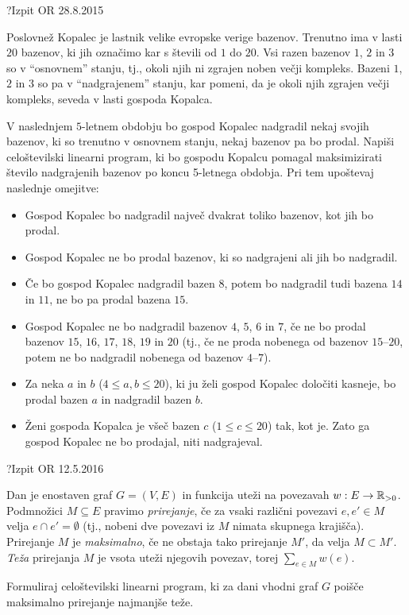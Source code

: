 \begin{naloga}{?}{Izpit OR 28.8.2015}
\begin{vprasanje}[kopalec]
Poslovnež Kopalec je lastnik velike evropske verige bazenov.
Trenutno ima v lasti $20$ bazenov,
ki jih označimo kar s števili od $1$ do $20$.
Vsi razen bazenov $1$, $2$ in $3$ so v ``osnovnem'' stanju,
tj., okoli njih ni zgrajen noben večji kompleks.
Bazeni $1$, $2$ in $3$ so pa v ``nadgrajenem'' stanju,
kar pomeni, da je okoli njih zgrajen večji kompleks,
seveda v lasti gospoda Kopalca.

V naslednjem $5$-letnem obdobju
bo gospod Kopalec nadgradil nekaj svojih bazenov,
ki so trenutno v osnovnem stanju,
nekaj bazenov pa bo prodal.
Napiši celoštevilski linearni program,
ki bo gospodu Kopalcu pomagal maksimizirati število nadgrajenih bazenov
po koncu 5-letnega obdobja. Pri tem upoštevaj naslednje omejitve:
\begin{itemize}
\item Gospod Kopalec bo nadgradil največ dvakrat toliko bazenov,
kot jih bo prodal.
\item Gospod Kopalec ne bo prodal bazenov,
ki so nadgrajeni ali jih bo nadgradil.
\item Če bo gospod Kopalec nadgradil bazen $8$,
potem bo nadgradil tudi bazena $14$ in $11$, ne bo pa prodal bazena $15$.
\item Gospod Kopalec ne bo nadgradil bazenov $4$, $5$, $6$ in $7$,
če ne bo prodal bazenov $15$, $16$, $17$, $18$, $19$ in $20$
(tj., če ne proda nobenega od bazenov $15$--$20$,
potem ne bo nadgradil nobenega od bazenov $4$--$7$).
\item Za neka $a$ in $b$ ($4 \le a, b \le 20$),
ki ju želi gospod Kopalec določiti kasneje,
bo prodal bazen $a$ in nadgradil bazen $b$.
\item Ženi gospoda Kopalca je všeč bazen $c$ ($1 \le c \le 20$) tak, kot je.
Zato ga gospod Kopalec ne bo prodajal, niti nadgrajeval.
\end{itemize}
\end{vprasanje}
\begin{odgovor}
\end{odgovor}
\end{naloga}


\begin{naloga}{?}{Izpit OR 12.5.2016}
\begin{vprasanje}[maxminprirejanje]
Dan je enostaven graf $G = (V, E)$
in funkcija uteži na povezavah $w : E \to \mathbb{R}_{>0}$.
Podmnožici $M \subseteq E$ pravimo {\em prirejanje},
če za vsaki različni povezavi $e, e' \in M$ velja $e \cap e' = \emptyset$
(tj., nobeni dve povezavi iz $M$ nimata skupnega krajišča).
Prirejanje $M$ je {\em maksimalno},
če ne obstaja tako prirejanje $M'$, da velja $M \subset M'$.
{\em Teža} prirejanja $M$ je vsota uteži njegovih povezav,
torej $\sum_{e \in M} w(e)$.

Formuliraj celoštevilski linearni program,
ki za dani vhodni graf $G$ poišče maksimalno prirejanje najmanjše teže.
\end{vprasanje}
\begin{odgovor}
\end{odgovor}
\end{naloga}


